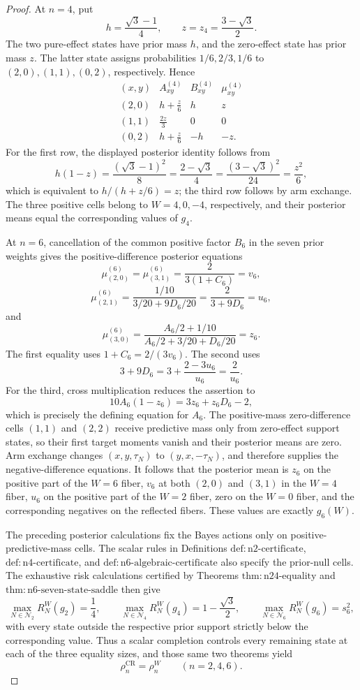 \documentclass{article}
\begin{document}
\begin{proof}
At \(n=4\), put
\[
 h=\frac{\sqrt3-1}{4},
 \qquad
 z=z_4=\frac{3-\sqrt3}{2}.
\]
The two pure-effect states have prior mass \(h\), and the zero-effect state has prior mass \(z\).  The latter state assigns probabilities \(1/6,2/3,1/6\) to \((2,0),(1,1),(0,2)\), respectively.  Hence
\[
\begin{array}{c|ccc}
(x,y)&A_{xy}^{(4)}&B_{xy}^{(4)}&\mu_{xy}^{(4)}\\ \hline
(2,0)&h+\frac z6&h&z\\[2pt]
(1,1)&\frac{2z}{3}&0&0\\[2pt]
(0,2)&h+\frac z6&-h&-z .
\end{array}
\]
For the first row, the displayed posterior identity follows from
\[
 h(1-z)=\frac{(\sqrt3-1)^2}{8}
 =\frac{2-\sqrt3}{4}
 =\frac{(3-\sqrt3)^2}{24}
 =\frac{z^2}{6},
\]
which is equivalent to \(h/(h+z/6)=z\); the third row follows by arm exchange.  The three positive cells belong to \(W=4,0,-4\), respectively, and their posterior means equal the corresponding values of \(g_4\).

At \(n=6\), cancellation of the common positive factor \(B_6\) in the seven prior weights gives the positive-difference posterior equations
\[
 \mu_{(2,0)}^{(6)}=\mu_{(3,1)}^{(6)}
 =\frac{2}{3(1+C_6)}=v_6,
\]
\[
 \mu_{(2,1)}^{(6)}
 =\frac{1/10}{3/20+9D_6/20}
 =\frac{2}{3+9D_6}=u_6,
\]
and
\[
 \mu_{(3,0)}^{(6)}
 =\frac{A_6/2+1/10}{A_6/2+3/20+D_6/20}=z_6.
\]
The first equality uses \(1+C_6=2/(3v_6)\).  The second uses
\[
 3+9D_6
 =3+\frac{2-3u_6}{u_6}
 =\frac2{u_6}.
\]
For the third, cross multiplication reduces the assertion to
\[
 10A_6(1-z_6)=3z_6+z_6D_6-2,
\]
which is precisely the defining equation for \(A_6\).  The positive-mass zero-difference cells \((1,1)\) and \((2,2)\) receive predictive mass only from zero-effect support states, so their first target moments vanish and their posterior means are zero.  Arm exchange changes \((x,y,\tau_N)\) to \((y,x,-\tau_N)\), and therefore supplies the negative-difference equations.  It follows that the posterior mean is \(z_6\) on the positive part of the \(W=6\) fiber, \(v_6\) at both \((2,0)\) and \((3,1)\) in the \(W=4\) fiber, \(u_6\) on the positive part of the \(W=2\) fiber, zero on the \(W=0\) fiber, and the corresponding negatives on the reflected fibers.  These values are exactly \(g_6(W)\).

The preceding posterior calculations fix the Bayes actions only on positive-predictive-mass cells.  The scalar rules in Definitions
\(\mathrm{def{:}n2\mbox{-}certificate}\),
\(\mathrm{def{:}n4\mbox{-}certificate}\), and
\(\mathrm{def{:}n6\mbox{-}algebraic\mbox{-}certificate}\)
also specify the prior-null cells.  The exhaustive risk calculations certified by Theorems
\(\mathrm{thm{:}n24\mbox{-}equality}\) and
\(\mathrm{thm{:}n6\mbox{-}seven\mbox{-}state\mbox{-}saddle}\)
then give
\[
 \max_{N\in\mathcal N_2}R_N^W(g_2)=\frac14,\qquad
 \max_{N\in\mathcal N_4}R_N^W(g_4)=1-\frac{\sqrt3}{2},\qquad
 \max_{N\in\mathcal N_6}R_N^W(g_6)=s_6^2,
\]
with every state outside the respective prior support strictly below the corresponding value.  Thus a scalar completion controls every remaining state at each of the three equality sizes, and those same two theorems yield
\[
 \rho_n^{\mathrm{CR}}=\rho_n^W\qquad(n=2,4,6).
\]


\end{proof}
\end{document}
